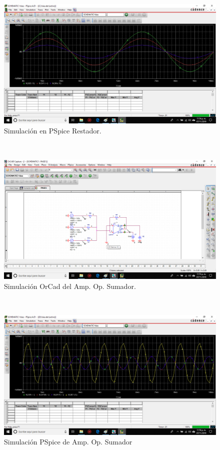 \documentclass[14pt,letterpaper]{article}
\begin{document}
\
\begin{figure}[h!]
\begin{center}
\includegraphics[scale=0.5]{Simulacion-PCB/simrestador.png} 
\caption{Simulación en PSpice Restador.}
\end{center}
\end{figure}

\
\begin{figure}[h!]
\begin{center}
\includegraphics[scale=0.5]{Simulacion-PCB/sumador.png} 
\caption{Simulación OrCad del Amp. Op. Sumador.}
\end{center}
\end{figure}

\
\begin{figure}[h!]
\begin{center}
\includegraphics[scale=0.5]{Simulacion-PCB/simsumador.png}
\caption{Simulación PSpice de Amp. Op. Sumador} 
\end{center}
\end{figure}
\end{document}
